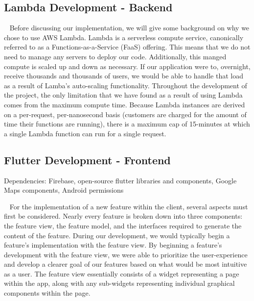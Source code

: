 \documentclass[10pt, a4paper]{article}
\begin{document}
\subsection{Lambda Development - Backend}
\par ~ Before discussing our implementation, we will give some background on why we chose to use AWS Lambda. Lambda is a serverless compute service, canonically referred to as a Functions-as-a-Service (FaaS) offering. This means that we do not need to manage any servers to deploy our code. Additionally, this manged compute is scaled up and down as necessary. If our application were to, overnight, receive thousands and thousands of users, we would be able to handle that load as a result of Lamba's auto-scaling functionality. Throughout the development of the project, the only limitation that we have found as a result of using Lambda comes from the maximum compute time. Because Lambda instances are derived on a per-request, per-nanosecond basis (customers are charged for the amount of time their functions are running), there is a maximum cap of 15-minutes at which a single Lambda function can run for a single request.

\subsection{Flutter Development - Frontend}
Dependencies: Firebase, open-source flutter libraries and components, Google Maps components, Android permissions
\par ~ For the implementation of a new feature within the client, several aspects must first be considered. Nearly every feature is broken down into three components: the feature view, the feature model, and the interfaces required to generate the content of the feature. During our development, we would typically begin a feature's implementation with the feature view. By beginning a feature's development with the feature view, we were able to prioritize the user-experience and develop a clearer goal of our features based on what would be most intuitive as a user. The feature view essentially consists of a widget representing a page within the app, along with any sub-widgets representing individual graphical components within the page. 
\end{document}
